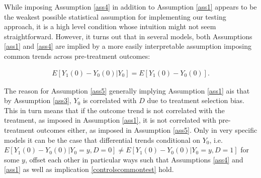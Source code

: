 {While imposing Assumption \ref{ass4} in addition to Assumption \ref{ass1} appears to be the weakest possible statistical assumption for implementing our testing approach, it is a high level condition whose intuition might not seem straightforward. However, it turns out that in several models, both Assumptions \ref{ass1} and \ref{ass4} are implied by a more easily interpretable assumption imposing common trends across pre-treatment outcomes:
	\begin{assumption}\label{ass5}
		\begin{eqnarray*}
			E[Y_1(0)-Y_0(0)|Y_0]=E[Y_1(0)-Y_0(0)].
		\end{eqnarray*}
	\end{assumption}
\noindent The reason for Assumption \ref{ass5} generally implying Assumption \ref{ass1} ais that by Assumption \ref{ass3}, $Y_0$ is correlated with $D$ due to treatment selection bias. This in turn means that if the outcome trend is not correlated with the treatment, as imposed in Assumption  \ref{ass1}, it is not correlated with pre-treatment outcomes either, as imposed in Assumption  \ref{ass5}. Only in very specific models it can be the case that differential trends conditional on $Y_0$, i.e.\  $E[Y_1(0)-Y_0(0)|Y_0=y,D=0]\neq E[Y_1(0)-Y_0(0)|Y_0=y,D=1]$ for some $y$, offset each other in particular ways such that Assumptions  \ref{ass4} and \ref{ass1} as well as implication \eqref{controlscommontest} hold.

}
